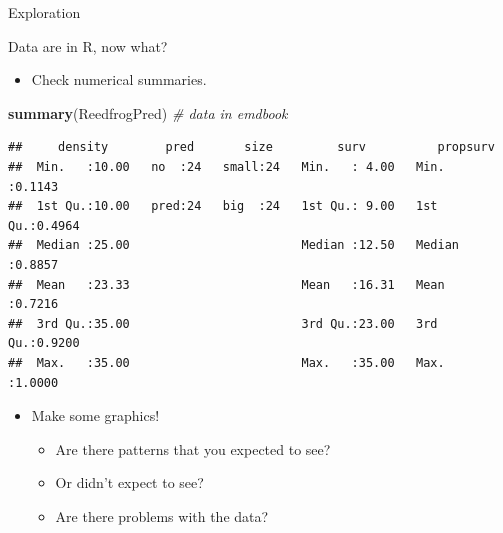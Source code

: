 \documentclass[
  ignorenonframetext,
]{beamer}
\newenvironment{Shaded}{\begin{snugshade}}{\end{snugshade}}
\newcommand{\CommentTok}[1]{\textcolor[rgb]{0.56,0.35,0.01}{\textit{#1}}}
\newcommand{\KeywordTok}[1]{\textcolor[rgb]{0.13,0.29,0.53}{\textbf{#1}}}
\newcommand{\NormalTok}[1]{#1}
\providecommand{\tightlist}{%
  \setlength{\itemsep}{0pt}\setlength{\parskip}{0pt}}
\begin{document}
\begin{frame}[fragile]{Exploration}
\protect\hypertarget{exploration}{}

Data are in R, now what?

\begin{itemize}
\tightlist
\item
  Check numerical summaries.
\end{itemize}

\scriptsize

\begin{Shaded}
\begin{Highlighting}[]
\KeywordTok{summary}\NormalTok{(ReedfrogPred) }\CommentTok{# data in emdbook}
\end{Highlighting}
\end{Shaded}

\begin{verbatim}
##     density        pred       size         surv          propsurv     
##  Min.   :10.00   no  :24   small:24   Min.   : 4.00   Min.   :0.1143  
##  1st Qu.:10.00   pred:24   big  :24   1st Qu.: 9.00   1st Qu.:0.4964  
##  Median :25.00                        Median :12.50   Median :0.8857  
##  Mean   :23.33                        Mean   :16.31   Mean   :0.7216  
##  3rd Qu.:35.00                        3rd Qu.:23.00   3rd Qu.:0.9200  
##  Max.   :35.00                        Max.   :35.00   Max.   :1.0000
\end{verbatim}

\normalsize

\begin{itemize}
\tightlist
\item
  Make some graphics!

  \begin{itemize}
  \tightlist
  \item
    Are there patterns that you expected to see?
  \item
    Or didn't expect to see?
  \item
    Are there problems with the data?
  \end{itemize}
\end{itemize}

\end{frame}
\end{document}
